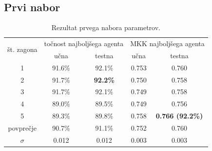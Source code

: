 \subsection{Prvi nabor}\label{subsec:dodatek-statlog-prvi-nabor}
\begin{table}[H]
    \begin{center}
        \begin{tabular}{|| c | c c || c c ||}
            \hline
            \multirow{2}{*}{št. zagona} & \multicolumn{2}{c||}{točnost najboljšega agenta} & \multicolumn{2}{c||}{MKK najboljšega agenta} \\ \cline{2-5}
            & učna   & testna          & učna  & testna                  \\
            \hline
            1         & 91.6\% & 92.1\%          & 0.753 & 0.760                   \\
            \hline
            2         & 91.7\% & \textbf{92.2\%} & 0.750 & 0.758                   \\
            \hline
            3         & 91.7\% & 92.1\%          & 0.749 & 0.758                   \\
            \hline
            4         & 89.0\% & 89.5\%          & 0.749 & 0.756                   \\
            \hline
            5         & 89.3\% & 89.8\%          & 0.758 & \textbf{0.766 (92.2\%)} \\
            \hline
            povprečje & 90.7\% & 91.1\%          & 0.752 & 0.760                   \\
            \hline
            $\sigma$  & 0.012  & 0.012           & 0.003 & 0.003                   \\
            \hline
        \end{tabular}
    \end{center}
    \caption{Rezultat prvega nabora parametrov.}
    \label{tab:statlog_result_1}
\end{table}

